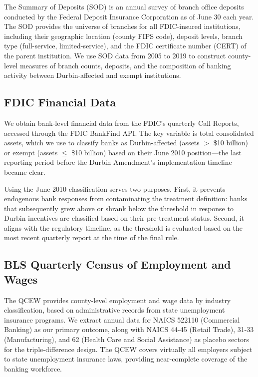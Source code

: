 \documentclass[12pt]{article}
\begin{document}
The Summary of Deposits (SOD) is an annual survey of branch office deposits conducted by the Federal Deposit Insurance Corporation as of June 30 each year. The SOD provides the universe of branches for all FDIC-insured institutions, including their geographic location (county FIPS code), deposit levels, branch type (full-service, limited-service), and the FDIC certificate number (CERT) of the parent institution. We use SOD data from 2005 to 2019 to construct county-level measures of branch counts, deposits, and the composition of banking activity between Durbin-affected and exempt institutions.

\subsection{FDIC Financial Data}

We obtain bank-level financial data from the FDIC's quarterly Call Reports, accessed through the FDIC BankFind API. The key variable is total consolidated assets, which we use to classify banks as Durbin-affected (assets $>$ \$10 billion) or exempt (assets $\leq$ \$10 billion) based on their June 2010 position---the last reporting period before the Durbin Amendment's implementation timeline became clear.

Using the June 2010 classification serves two purposes. First, it prevents endogenous bank responses from contaminating the treatment definition: banks that subsequently grew above or shrank below the threshold in response to Durbin incentives are classified based on their pre-treatment status. Second, it aligns with the regulatory timeline, as the threshold is evaluated based on the most recent quarterly report at the time of the final rule.

\subsection{BLS Quarterly Census of Employment and Wages}

The QCEW provides county-level employment and wage data by industry classification, based on administrative records from state unemployment insurance programs. We extract annual data for NAICS 522110 (Commercial Banking) as our primary outcome, along with NAICS 44-45 (Retail Trade), 31-33 (Manufacturing), and 62 (Health Care and Social Assistance) as placebo sectors for the triple-difference design. The QCEW covers virtually all employers subject to state unemployment insurance laws, providing near-complete coverage of the banking workforce.
\end{document}
